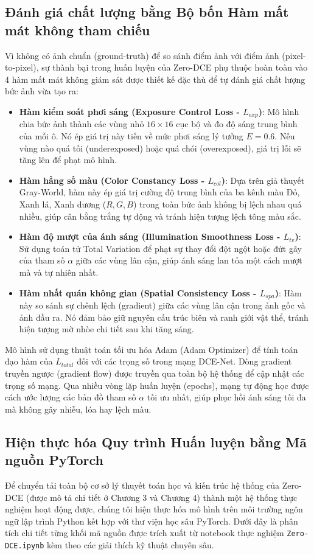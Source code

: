 \documentclass[a4paper]{article}
\begin{document}
\subsection{Đánh giá chất lượng bằng Bộ bốn Hàm mất mát không tham chiếu}
Vì không có ảnh chuẩn (ground-truth) để so sánh điểm ảnh với điểm ảnh (pixel-to-pixel), sự thành bại trong huấn luyện của Zero-DCE phụ thuộc hoàn toàn vào 4 hàm mất mát không giám sát được thiết kế đặc thù để tự đánh giá chất lượng bức ảnh vừa tạo ra:
\begin{itemize}
    \item \textbf{Hàm kiểm soát phơi sáng (Exposure Control Loss - $L_{exp}$)}: Mô hình chia bức ảnh thành các vùng nhỏ $16 \times 16$ cục bộ và đo độ sáng trung bình của mỗi ô. Nó ép giá trị này tiến về mức phơi sáng lý tưởng $E = 0.6$. Nếu vùng nào quá tối (underexposed) hoặc quá chói (overexposed), giá trị lỗi sẽ tăng lên để phạt mô hình.
    \item \textbf{Hàm hằng số màu (Color Constancy Loss - $L_{col}$)}: Dựa trên giả thuyết Gray-World, hàm này ép giá trị cường độ trung bình của ba kênh màu Đỏ, Xanh lá, Xanh dương ($R, G, B$) trong toàn bức ảnh không bị lệch nhau quá nhiều, giúp cân bằng trắng tự động và tránh hiện tượng lệch tông màu sắc.
    \item \textbf{Hàm độ mượt của ánh sáng (Illumination Smoothness Loss - $L_{tv}$)}: Sử dụng toán tử Total Variation để phạt sự thay đổi đột ngột hoặc đứt gãy của tham số $\alpha$ giữa các vùng lân cận, giúp ánh sáng lan tỏa một cách mượt mà và tự nhiên nhất.
    \item \textbf{Hàm nhất quán không gian (Spatial Consistency Loss - $L_{spa}$)}: Hàm này so sánh sự chênh lệch (gradient) giữa các vùng lân cận trong ảnh gốc và ảnh đầu ra. Nó đảm bảo giữ nguyên cấu trúc biên và ranh giới vật thể, tránh hiện tượng mờ nhòe chi tiết sau khi tăng sáng.
\end{itemize}

Mô hình sử dụng thuật toán tối ưu hóa Adam (Adam Optimizer) để tính toán đạo hàm của $L_{total}$ đối với các trọng số trong mạng DCE-Net. Dòng gradient truyền ngược (gradient flow) được truyền qua toàn bộ hệ thống để cập nhật các trọng số mạng. Qua nhiều vòng lặp huấn luyện (epochs), mạng tự động học được cách ước lượng các bản đồ tham số $\alpha$ tối ưu nhất, giúp phục hồi ánh sáng tối đa mà không gây nhiễu, lóa hay lệch màu.

\subsection{Hiện thực hóa Quy trình Huấn luyện bằng Mã nguồn PyTorch}
Để chuyển tải toàn bộ cơ sở lý thuyết toán học và kiến trúc hệ thống của Zero-DCE (được mô tả chi tiết ở Chương 3 và Chương 4) thành một hệ thống thực nghiệm hoạt động được, chúng tôi hiện thực hóa mô hình trên môi trường ngôn ngữ lập trình Python kết hợp với thư viện học sâu PyTorch. Dưới đây là phân tích chi tiết từng khối mã nguồn được trích xuất từ notebook thực nghiệm \texttt{Zero-DCE.ipynb} kèm theo các giải thích kỹ thuật chuyên sâu.
\end{document}
